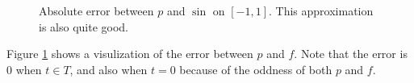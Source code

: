 \documentclass{homework}
\begin{document}
\begin{alphaparts}
		\begin{figure}
			\centering
			\caption{Absolute error between $p$ and $\sin$ on $[-1,1]$. This approximation is also quite good.}
			\label{fig:lagrange_error}
		\end{figure}
		Figure \ref{fig:lagrange_error} shows a visulization of the error between $p$ and $f$. Note that the error is $0$ when $t \in T$, and also when $t= 0$ because of the oddness of both $p$ and $f$.
	\end{alphaparts}
	
\end{document}
